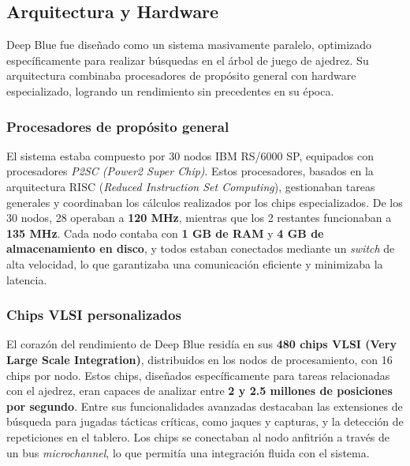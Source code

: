 \documentclass[12pt,a4paper]{article}
\begin{document}
\subsection{Arquitectura y Hardware}
Deep Blue fue diseñado como un sistema masivamente paralelo, optimizado específicamente para realizar búsquedas en el árbol de juego de ajedrez. Su arquitectura combinaba procesadores de propósito general con hardware especializado, logrando un rendimiento sin precedentes en su época.

\subsubsection*{Procesadores de propósito general}
El sistema estaba compuesto por 30 nodos IBM RS/6000 SP, equipados con procesadores \textit{P2SC (Power2 Super Chip)}. Estos procesadores, basados en la arquitectura RISC (\textit{Reduced Instruction Set Computing}), gestionaban tareas generales y coordinaban los cálculos realizados por los chips especializados. De los 30 nodos, 28 operaban a \textbf{120 MHz}, mientras que los 2 restantes funcionaban a \textbf{135 MHz}. Cada nodo contaba con \textbf{1 GB de RAM} y \textbf{4 GB de almacenamiento en disco}, y todos estaban conectados mediante un \textit{switch} de alta velocidad, lo que garantizaba una comunicación eficiente y minimizaba la latencia.

\subsubsection*{Chips VLSI personalizados}
El corazón del rendimiento de Deep Blue residía en sus \textbf{480 chips VLSI (Very Large Scale Integration)}, distribuidos en los nodos de procesamiento, con 16 chips por nodo. Estos chips, diseñados específicamente para tareas relacionadas con el ajedrez, eran capaces de analizar entre \textbf{2 y 2.5 millones de posiciones por segundo}. Entre sus funcionalidades avanzadas destacaban las extensiones de búsqueda para jugadas tácticas críticas, como jaques y capturas, y la detección de repeticiones en el tablero. Los chips se conectaban al nodo anfitrión a través de un bus \textit{microchannel}, lo que permitía una integración fluida con el sistema.
\end{document}

